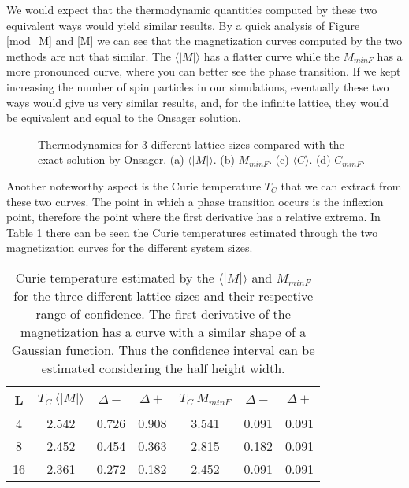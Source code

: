 	We would expect that the thermodynamic quantities computed by these two equivalent ways would yield similar results. By a quick analysis of Figure \ref{mod_M} and \ref{M} we can see that the magnetization curves computed by the two methods are not that similar. The $\langle |M| \rangle$ has a flatter curve while the $M_{minF}$ has a more pronounced curve, where you can better see the phase transition. If we kept increasing the number of spin particles in our simulations, eventually these two ways would give us very similar results, and, for the infinite lattice, they would be equivalent and equal to the Onsager solution. 
\begin{figure}[h]
	\centering
	
	\caption{Thermodynamics for 3 different lattice sizes compared with the exact solution by Onsager. (a) $\langle |M| \rangle$. (b) $M_{minF}$. (c) $\langle C \rangle$. (d) $C_{minF}$.}
	\label{thermo_4}
\end{figure}
	Another noteworthy aspect is the Curie temperature $T_C$ that we can extract from these two curves. The point in which a phase transition occurs is the inflexion point, therefore the point where the first derivative has a relative extrema. In Table \ref{TC_table} there can be seen the Curie temperatures estimated through the two magnetization curves for the different system sizes. 

\begin{table}[h]
\centering
\caption{Curie temperature estimated by the $\langle |M| \rangle$ and $M_{minF}$ for the three different lattice sizes and their respective range of confidence. The first derivative of the magnetization has a curve with a similar shape of a Gaussian function. Thus the confidence interval can be estimated considering the half height width.}
\begin{tabular}{c|ccc|ccc}
L  & $T_C\ \langle |M| \rangle$ & $\Delta -$ & $\Delta +$ & $T_C\ M_{minF}$ & $\Delta -$ & $\Delta +$ \\ \hline
4  & 2.542                                                 & 0.726                  & 0.908         & 3.541           & 0.091                  & 0.091                \\
8  & 2.452                                                 & 0.454                   & 0.363                  & 2.815           & 0.182         & 0.091                  \\
16 & 2.361                                                 & 0.272                  & 0.182                  & 2.452           & 0.091                  & 0.091                 
\end{tabular}
\label{TC_table}
\end{table}

